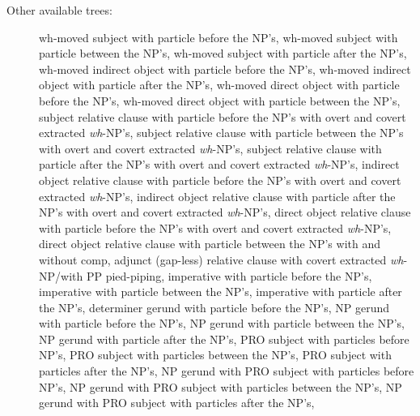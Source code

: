 \begin{description}
\item[Other available trees:] wh-moved subject with particle before the
NP's, wh-moved subject with particle between the NP's, wh-moved subject
with particle after the NP's, wh-moved indirect object with particle before
the NP's, wh-moved indirect object with particle after the NP's, wh-moved
direct object with particle before the NP's, wh-moved direct object with
particle between the NP's, subject relative clause with particle before the
NP's with overt and covert extracted {\it wh}-NP's, subject relative clause
with particle between the NP's with overt and covert extracted {\it
wh}-NP's, subject relative clause with particle after the NP's with overt
and covert extracted {\it wh}-NP's, indirect object relative clause with
particle before the NP's with overt and covert extracted {\it wh}-NP's,
indirect object relative clause with particle after the NP's with overt and
covert extracted {\it wh}-NP's, direct object relative clause with particle
before the NP's with overt and covert extracted {\it wh}-NP's, direct
object relative clause with particle between the NP's with and without
comp, adjunct (gap-less) relative clause with covert extracted {\it
wh}-NP/with PP pied-piping, imperative with particle before the NP's,
imperative with particle between the NP's, imperative with particle after
the NP's, determiner gerund with particle before the NP's, NP gerund with
particle before the NP's, NP gerund with particle between the NP's, NP
gerund with particle after the NP's, PRO subject with particles before
NP's, PRO subject with particles between the NP's, PRO subject with
particles after the NP's, NP gerund with PRO subject with particles before
NP's, NP gerund with PRO subject with particles between the NP's, NP gerund
with PRO subject with particles after the NP's,

\end{description}






